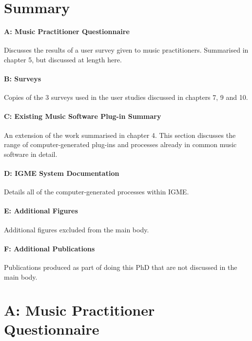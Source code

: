 \iffalse

\chapter{Summary}

\subsubsection{A: Music Practitioner Questionnaire}
Discusses the results of a user survey given to music practitioners. Summarised in chapter 5, but discussed at length here. 

\subsubsection{B: Surveys}
Copies of the 3 surveys used in the user studies discussed in chapters 7, 9 and 10.

\subsubsection{C: Existing Music Software Plug-in Summary}
An extension of the work summarised in chapter 4. This section discusses the range of computer-generated plug-ins and processes already in common music software in detail.

\subsubsection{D: IGME System Documentation}
Details all of the computer-generated processes within IGME.

\subsubsection{E: Additional Figures}
Additional figures excluded from the main body.

\subsubsection{F: Additional Publications}
Publications produced as part of doing this PhD that are not discussed in the main body.

\appendix
{}
\chapter{A: Music Practitioner Questionnaire}

